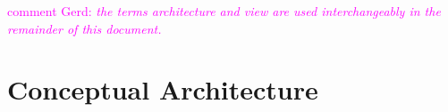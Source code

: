 \documentclass{llncs} %
\newcommand{\ggr}[1]{\textcolor{magenta}{comment Gerd: \textit{#1}}}
\begin{document}
%	
%					 


	
	
	
	
	

\ggr{the terms architecture and view are used interchangeably in the remainder of this document.}



\section{Conceptual Architecture}
\end{document}
